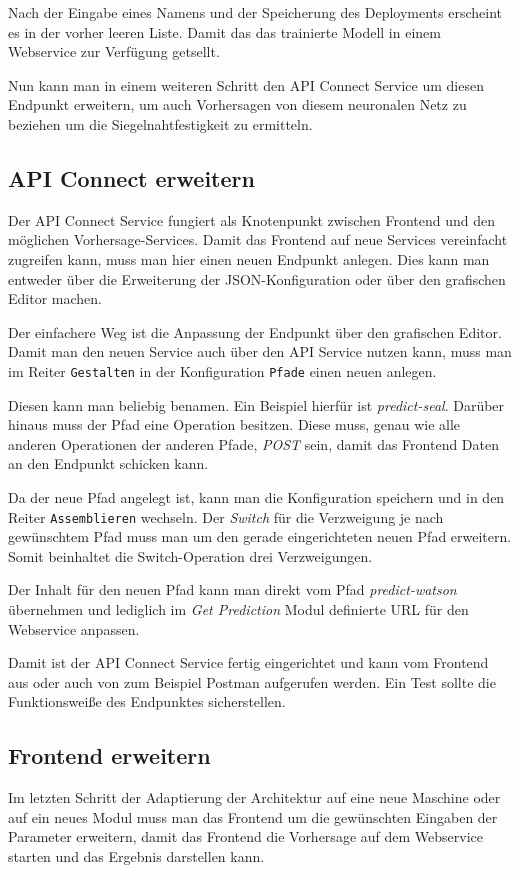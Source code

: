 Nach der Eingabe eines Namens und der Speicherung des Deployments erscheint es in der vorher leeren Liste. Damit das das
trainierte Modell in einem Webservice zur Verfügung getsellt.

Nun kann man in einem weiteren Schritt den API Connect Service um diesen Endpunkt erweitern, um auch Vorhersagen von
diesem neuronalen Netz zu beziehen um die Siegelnahtfestigkeit zu ermitteln.

\subsection{API Connect erweitern}
Der API Connect Service fungiert als Knotenpunkt zwischen Frontend und den möglichen Vorhersage-Services. Damit das
Frontend auf neue Services vereinfacht zugreifen kann, muss man hier einen neuen Endpunkt anlegen. Dies kann man
entweder über die Erweiterung der JSON-Konfiguration oder über den grafischen Editor machen.

Der einfachere Weg ist die Anpassung der Endpunkt über den grafischen Editor. Damit man den neuen Service auch über den
API Service nutzen kann, muss man im Reiter \texttt{Gestalten} in der Konfiguration \texttt{Pfade} einen neuen anlegen.

Diesen kann man beliebig benamen. Ein Beispiel hierfür ist \textit{predict-seal}. Darüber hinaus muss der Pfad eine
Operation besitzen. Diese muss, genau wie alle anderen Operationen der anderen Pfade, \textit{POST} sein, damit das
Frontend Daten an den Endpunkt schicken kann.

Da der neue Pfad angelegt ist, kann man die Konfiguration speichern und in den Reiter \texttt{Assemblieren} wechseln.
Der \textit{Switch} für die Verzweigung je nach gewünschtem Pfad muss man um den gerade eingerichteten neuen Pfad
erweitern. Somit beinhaltet die Switch-Operation drei Verzweigungen.

Der Inhalt für den neuen Pfad kann man direkt vom Pfad \textit{predict-watson} übernehmen und lediglich im
\textit{Get Prediction} Modul definierte URL für den Webservice anpassen.

Damit ist der API Connect Service fertig eingerichtet und kann vom Frontend aus oder auch von zum Beispiel Postman
aufgerufen werden. Ein Test sollte die Funktionsweiße des Endpunktes sicherstellen.

\subsection{Frontend erweitern}
Im letzten Schritt der Adaptierung der Architektur auf eine neue Maschine oder auf ein neues Modul muss man das Frontend
um die gewünschten Eingaben der Parameter erweitern, damit das Frontend die Vorhersage auf dem Webservice starten und
das Ergebnis darstellen kann.

